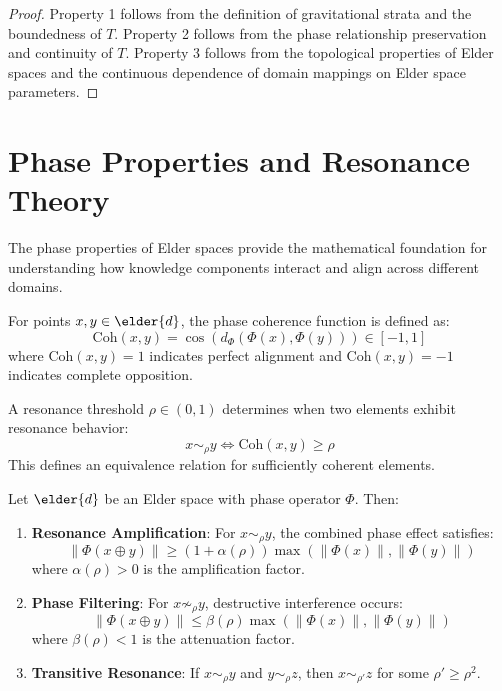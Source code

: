 \begin{proof}
Property 1 follows from the definition of gravitational strata and the boundedness of $T$. Property 2 follows from the phase relationship preservation and continuity of $T$. Property 3 follows from the topological properties of Elder spaces and the continuous dependence of domain mappings on Elder space parameters.
\end{proof}

\section{Phase Properties and Resonance Theory}

The phase properties of Elder spaces provide the mathematical foundation for understanding how knowledge components interact and align across different domains.

\begin{definition}
For points $x, y \in \elder{d}$, the phase coherence function is defined as:
\begin{equation}
\text{Coh}(x, y) = \cos(d_{\Phi}(\Phi(x), \Phi(y))) \in [-1, 1]
\end{equation}
where $\text{Coh}(x, y) = 1$ indicates perfect alignment and $\text{Coh}(x, y) = -1$ indicates complete opposition.
\end{definition}

\begin{definition}
A resonance threshold $\rho \in (0, 1)$ determines when two elements exhibit resonance behavior:
\begin{equation}
x \sim_\rho y \iff \text{Coh}(x, y) \geq \rho
\end{equation}
This defines an equivalence relation for sufficiently coherent elements.
\end{definition}

\begin{theorem}
Let $\elder{d}$ be an Elder space with phase operator $\Phi$. Then:
\begin{enumerate}
    \item \textbf{Resonance Amplification}: For $x \sim_\rho y$, the combined phase effect satisfies:
    \begin{equation}
    \|\Phi(x \oplus y)\| \geq (1 + \alpha(\rho)) \max(\|\Phi(x)\|, \|\Phi(y)\|)
    \end{equation}
    where $\alpha(\rho) > 0$ is the amplification factor.
    
    \item \textbf{Phase Filtering}: For $x \not\sim_\rho y$, destructive interference occurs:
    \begin{equation}
    \|\Phi(x \oplus y)\| \leq \beta(\rho) \max(\|\Phi(x)\|, \|\Phi(y)\|)
    \end{equation}
    where $\beta(\rho) < 1$ is the attenuation factor.
    
    \item \textbf{Transitive Resonance}: If $x \sim_\rho y$ and $y \sim_\rho z$, then $x \sim_{\rho'} z$ for some $\rho' \geq \rho^2$.
\end{enumerate}
\end{theorem}

